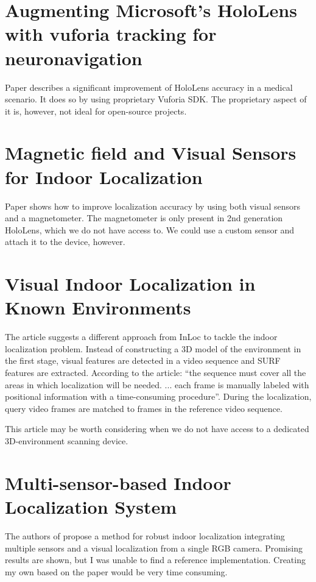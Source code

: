 \documentclass[twoside]{ctuthesis}
\theoremstyle{plain}
\theoremstyle{definition}
\theoremstyle{note}
\begin{document}
\section{Augmenting Microsoft’s HoloLens with vuforia tracking for neuronavigation}
Paper \cite{HoloLensVuforia} describes a significant improvement of HoloLens accuracy in a medical scenario. It does so by using proprietary Vuforia SDK. The proprietary aspect of it is, however, not ideal for open-source projects.

\section{Magnetic field and Visual Sensors for Indoor Localization}
Paper \cite{MagneticAndVisualIndoorLocalization} shows how to improve localization accuracy by using both visual sensors and a magnetometer. The magnetometer is only present in 2nd generation HoloLens, which we do not have access to. We could use a custom sensor and attach it to the device, however.

\section{Visual Indoor Localization in Known Environments}
The article \cite{VisualIndoorLocalizationInKnownEnvironments} suggests a different approach from InLoc to tackle the indoor localization problem. Instead of constructing a 3D model of the environment in the first stage, visual features are detected in a video sequence and SURF features \cite{SURF} are extracted. According to the article: ``the sequence must cover all the areas in which localization will be needed. ... each
frame is manually labeled with positional information with a
time-consuming procedure''. During the localization, query video frames are matched to frames in the reference video sequence.

This article may be worth considering when we do not have access to a dedicated 3D-environment scanning device.

\section{Multi-sensor-based Indoor Localization System}
The authors of \cite{MutliSensorLocalization} propose a method for robust indoor localization integrating multiple sensors and a visual localization from a single RGB camera. Promising results are shown, but I was unable to find a reference implementation. Creating my own based on the paper would be very time consuming.
\end{document}
